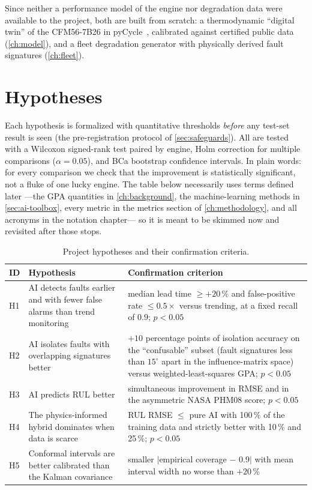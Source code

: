 Since neither a performance model of the engine nor degradation data were available to the
project, both are built from scratch: a thermodynamic ``digital twin'' of the CFM56-7B26 in
pyCycle~\cite{Hendricks2019}, calibrated against certified public data (\cref{ch:model}), and a
fleet degradation generator with physically derived fault signatures (\cref{ch:fleet}).

\section{Hypotheses}
\label{sec:hypotheses}

Each hypothesis is formalized with quantitative thresholds \emph{before} any test-set result is
seen (the pre-registration protocol of \cref{sec:safeguards}). All are tested with a Wilcoxon
signed-rank test paired by engine, Holm correction for multiple comparisons
($\alpha = 0.05$), and BCa bootstrap confidence intervals. In plain words: for every comparison
we check that the improvement is statistically significant, not a fluke of one lucky engine.
The table below necessarily uses terms defined later ---the GPA quantities in
\cref{ch:background}, the machine-learning methods in \cref{sec:ai-toolbox}, every metric in
the metrics section of \cref{ch:methodology}, and all acronyms in the notation chapter--- so
it is meant to be skimmed now and revisited after those stops.

\begin{table}[htbp]
  \centering\small
  \caption{Project hypotheses and their confirmation criteria.}
  \label{tab:hypotheses}
  \begin{tabular}{p{}p{}p{}}
    \toprule
    ID & Hypothesis & Confirmation criterion \\
    \midrule
    H1 & AI detects faults earlier and with fewer false alarms than trend monitoring &
      median lead time $\geq +20$\,\% and false-positive rate $\leq 0.5\times$ versus
      trending, at a fixed recall of $0.9$; $p<0.05$ \\
    H2 & AI isolates faults with overlapping signatures better &
      $+10$ percentage points of isolation accuracy on the ``confusable'' subset (fault
      signatures less than $15^{\circ}$ apart in the influence-matrix space) versus
      weighted-least-squares GPA; $p<0.05$ \\
    H3 & AI predicts RUL better &
      simultaneous improvement in RMSE and in the asymmetric NASA PHM08 score; $p<0.05$ \\
    H4 & The physics-informed hybrid dominates when data is scarce &
      RUL RMSE $\leq$ pure AI with 100\,\% of the training data and strictly better with
      10\,\% and 25\,\%; $p<0.05$ \\
    H5 & Conformal intervals are better calibrated than the Kalman covariance &
      smaller $|$empirical coverage $-$ 0.9$|$ with mean interval width no worse than
      $+20$\,\% \\
    \bottomrule
  \end{tabular}
\end{table}

